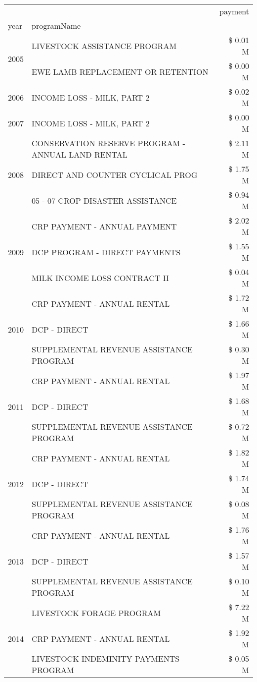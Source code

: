 \begin{tabular}{llr}
\toprule
 &  & payment \\
year & programName &  \\
\midrule
\multirow[t]{2}{*}{2005} & LIVESTOCK ASSISTANCE PROGRAM & \$ 0.01 M \\
 & EWE LAMB REPLACEMENT OR RETENTION & \$ 0.00 M \\
\cline{1-3}
2006 & INCOME LOSS - MILK, PART 2 & \$ 0.02 M \\
\cline{1-3}
2007 & INCOME LOSS - MILK, PART 2 & \$ 0.00 M \\
\cline{1-3}
\multirow[t]{3}{*}{2008} & CONSERVATION RESERVE PROGRAM - ANNUAL LAND RENTAL & \$ 2.11 M \\
 & DIRECT AND COUNTER CYCLICAL PROG & \$ 1.75 M \\
 & 05 - 07 CROP DISASTER ASSISTANCE & \$ 0.94 M \\
\cline{1-3}
\multirow[t]{3}{*}{2009} & CRP PAYMENT - ANNUAL PAYMENT & \$ 2.02 M \\
 & DCP PROGRAM - DIRECT PAYMENTS & \$ 1.55 M \\
 & MILK INCOME LOSS CONTRACT II & \$ 0.04 M \\
\cline{1-3}
\multirow[t]{3}{*}{2010} & CRP PAYMENT - ANNUAL RENTAL & \$ 1.72 M \\
 & DCP - DIRECT & \$ 1.66 M \\
 & SUPPLEMENTAL REVENUE ASSISTANCE PROGRAM & \$ 0.30 M \\
\cline{1-3}
\multirow[t]{3}{*}{2011} & CRP PAYMENT - ANNUAL RENTAL & \$ 1.97 M \\
 & DCP - DIRECT & \$ 1.68 M \\
 & SUPPLEMENTAL REVENUE ASSISTANCE PROGRAM & \$ 0.72 M \\
\cline{1-3}
\multirow[t]{3}{*}{2012} & CRP PAYMENT - ANNUAL RENTAL & \$ 1.82 M \\
 & DCP - DIRECT & \$ 1.74 M \\
 & SUPPLEMENTAL REVENUE ASSISTANCE PROGRAM & \$ 0.08 M \\
\cline{1-3}
\multirow[t]{3}{*}{2013} & CRP PAYMENT - ANNUAL RENTAL & \$ 1.76 M \\
 & DCP - DIRECT & \$ 1.57 M \\
 & SUPPLEMENTAL REVENUE ASSISTANCE PROGRAM & \$ 0.10 M \\
\cline{1-3}
\multirow[t]{3}{*}{2014} & LIVESTOCK FORAGE PROGRAM & \$ 7.22 M \\
 & CRP PAYMENT - ANNUAL RENTAL & \$ 1.92 M \\
 & LIVESTOCK INDEMINITY PAYMENTS PROGRAM & \$ 0.05 M \\

\end{tabular}
